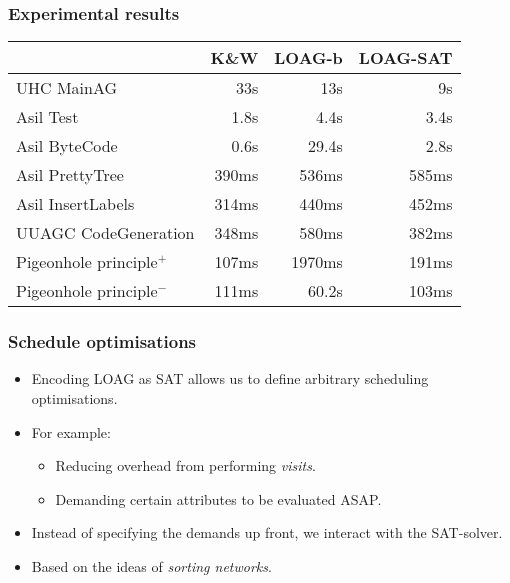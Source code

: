 \documentclass{beamer}
\begin{document}
\begin{frame}
    \frametitle{Experimental results}
    \begin{tabular}{l || r || r || r}
                 &   K\&W & LOAG-b & LOAG-SAT\\
      \hline
      UHC MainAG          & 33s   & 13s   & 9s    \\
      Asil Test              & 1.8s  & 4.4s  & 3.4s  \\
      Asil ByteCode         & 0.6s  & 29.4s & 2.8s  \\
      Asil PrettyTree         & 390ms & 536ms & 585ms \\
      Asil InsertLabels       & 314ms & 440ms & 452ms \\
      UUAGC CodeGeneration&  348ms & 580ms & 382ms \\
      Pigeonhole principle$^+$        & 107ms & 1970ms& 191ms \\ 
      Pigeonhole principle$^-$     & 111ms & 60.2s & 103ms
    \end{tabular}
\end{frame}

\begin{frame}
\frametitle{Schedule optimisations}
\begin{itemize}
    \item Encoding LOAG as SAT allows us to define arbitrary scheduling optimisations.
    \item For example:
        \begin{itemize}
            \item Reducing overhead from performing \emph{visits}.
            \item Demanding certain attributes to be evaluated ASAP.
        \end{itemize}
    \item Instead of specifying the demands up front, we interact with the SAT-solver.
    \item Based on the ideas of \emph{sorting networks}.
\end{itemize}
\end{frame}
\end{document}
